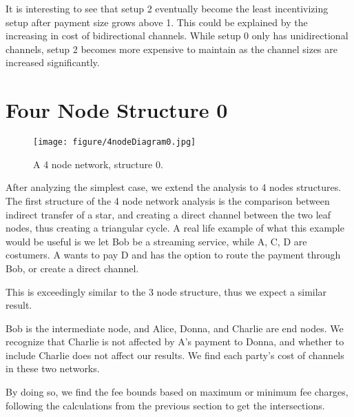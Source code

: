 \documentclass[twocolumn,10pt]{report}
\begin{document}
It is interesting to see that setup 2 eventually become the least incentivizing setup after payment size grows above 1. This could be explained by the increasing in cost of bidirectional channels. While setup 0 only has unidirectional channels, setup 2 becomes more expensive to maintain as the channel sizes are increased significantly. 




\section{Four Node Structure 0}
\begin{figure}[t]
    \begin{center}
    \setlength{\unitlength}{0.012500in}%
    \texttt{[image: figure/4nodeDiagram0.jpg]}
    \end{center}
    \caption{A 4 node network, structure 0.}
    \label{figure_4Node1} 
    \end{figure}

After analyzing the simplest case, we extend the analysis to 4 nodes structures. The first structure of the 4 node network analysis is the comparison between indirect transfer of a star, and creating a direct channel between the two leaf nodes, thus creating a triangular cycle. A real life example of what this example would be useful is we let Bob be a streaming service, while A, C, D are costumers. A wants to pay D and has the option to route the payment through Bob, or create a direct channel. 

This is exceedingly similar to the 3 node structure, thus we expect a similar result. 

Bob is the intermediate node, and Alice, Donna, and Charlie are end nodes. We recognize that Charlie is not affected by A's payment to Donna, and whether to include Charlie does not affect our results. We find each party's cost of channels in these two networks. 

By doing so, we find the fee bounds based on maximum or minimum fee charges, following the calculations from the previous section to get the intersections. 

\end{document}
